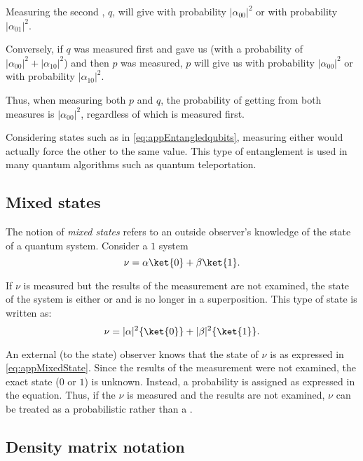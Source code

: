 Measuring the second \qubit{}, $q$, will give  with probability $|\alpha_{00}|^2$ or 
with probability $|\alpha_{01}|^2$.

Conversely, if $q$ was measured first and gave us  (with a probability of $|\alpha_{00}|^2 +
|\alpha_{10}|^2$) and then $p$ was measured, $p$ will give us  with probability
$|\alpha_{00}|^2$ or  with probability $|\alpha_{10}|^2$.

Thus, when measuring both $p$ and $q$, the probability of getting  from both measures is
$|\alpha_{00}|^2$, regardless of which \qubit{} is measured first.

Considering states such as in \vref{eq:appEntangledqubits}, measuring either \qubit{} would actually
force the other \qubit{} to the same value. This type of entanglement is used in many quantum
algorithms such as quantum teleportation.

\subsection{Mixed states} %
\label{sub:mixed_states}

The notion of \emph{mixed states} refers to an outside observer's knowledge of the state of a
quantum system. Consider a $1$ \qubit{} system
\begin{equation}
  \nu = \alpha\ket{0} + \beta\ket{1}.\label{eq:appOnequbitSystem}
\end{equation}

If $\nu$ is measured but the results of the measurement are not examined, the state of the system
is either  or  and is no longer in a superposition. This type of state is written as:
\begin{equation}
  \nu = |\alpha|^2\{\ket{0}\} + |\beta|^2\{\ket{1}\}.\label{eq:appMixedState}
\end{equation}

An external (to the state) observer knows that the state of $\nu$ is as expressed in
\vref{eq:appMixedState}. Since the results of the measurement were not examined, the exact state
($0$ or $1$) is unknown. Instead, a probability is assigned as expressed in the equation. Thus, if
the \qubit{} $\nu$ is measured and the results are not examined, $\nu$ can be treated as a
probabilistic \bit{} rather than a \qubit.


\subsection{Density matrix notation} %
\label{sub:density_matrix_notation}

